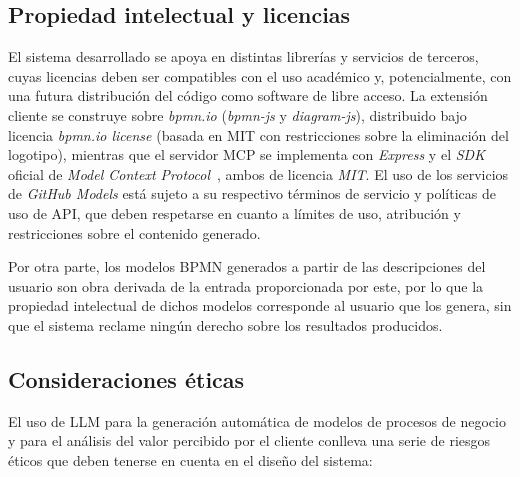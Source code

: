 {%
\subsection{Propiedad intelectual y licencias}
\label{subsec:propiedadIntelectual}

El sistema desarrollado se apoya en distintas librerías y servicios de terceros, cuyas licencias deben ser compatibles con el uso académico y, potencialmente, con una futura distribución del código como software de libre acceso. La extensión cliente se construye sobre \textit{bpmn.io} (\textit{bpmn-js} y \textit{diagram-js}), distribuido bajo licencia \textit{bpmn.io license} (basada en MIT con restricciones sobre la eliminación del logotipo), mientras que el servidor MCP se implementa con \textit{Express} y el \textit{SDK} oficial de \textit{Model Context Protocol}~\cite{anthropic2024mcp}, ambos de licencia \textit{MIT}. El uso de los servicios de \textit{GitHub Models} está sujeto a su respectivo términos de servicio y políticas de uso de API, que deben respetarse en cuanto a límites de uso, atribución y restricciones sobre el contenido generado.

Por otra parte, los modelos BPMN generados a partir de las descripciones del usuario son obra derivada de la entrada proporcionada por este, por lo que la propiedad intelectual de dichos modelos corresponde al usuario que los genera, sin que el sistema reclame ningún derecho sobre los resultados producidos.

\subsection{Consideraciones éticas}
\label{subsec:etica}

El uso de LLM para la generación automática de modelos de procesos de negocio y para el análisis del valor percibido por el cliente conlleva una serie de riesgos éticos que deben tenerse en cuenta en el diseño del sistema:

}
